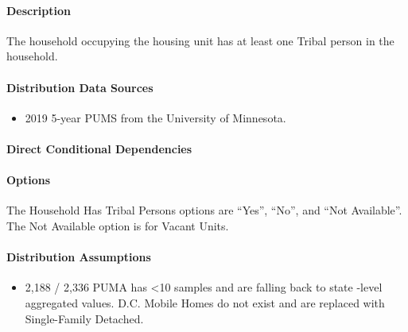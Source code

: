 \paragraph{Description}
% 
The household occupying the housing unit has at least one Tribal person
in the household.

\paragraph{Distribution Data Sources}
% 
\begin{itemize}
\item
  2019 5-year PUMS from the University of Minnesota.
\end{itemize}

\paragraph{Direct Conditional Dependencies}


\paragraph{Options}
The Household Has Tribal Persons options are ``Yes'', ``No'', and ``Not Available''. The Not Available option is for Vacant Units.

\paragraph{Distribution Assumptions}
% 
\begin{itemize}
\item
  2,188 / 2,336 PUMA has \textless10 samples and are falling back to state
-level aggregated values. D.C. Mobile Homes do not exist and are replaced
  with Single-Family Detached.
\end{itemize}
